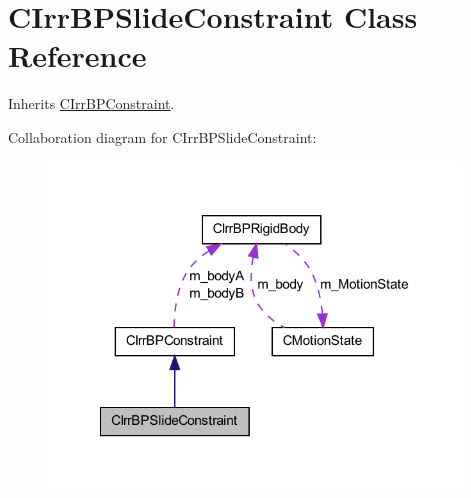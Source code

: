 \hypertarget{class_c_irr_b_p_slide_constraint}{
\section{CIrrBPSlideConstraint Class Reference}
\label{class_c_irr_b_p_slide_constraint}
}


Inherits \hyperlink{class_c_irr_b_p_constraint}{CIrrBPConstraint}.



Collaboration diagram for CIrrBPSlideConstraint:\nopagebreak
\begin{figure}[H]
\begin{center}
\leavevmode
\includegraphics[width=311pt]{class_c_irr_b_p_slide_constraint__coll__graph}
\end{center}
\end{figure}
